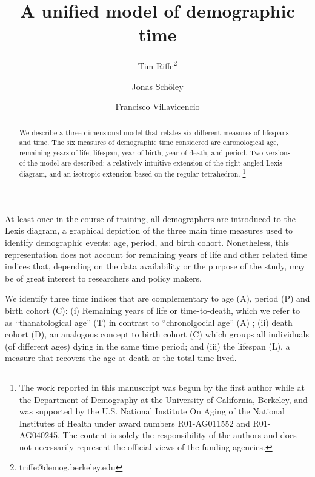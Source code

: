\documentclass[11pt,oneside,a4paper]{article} %
\newcommand\ackn[1]{%
  \begingroup
  \renewcommand\thefootnote{}\footnote{#1}%
  \addtocounter{footnote}{-1}%
  \endgroup
}
\begin{document}
\title{A unified model of demographic time}

\author[1]{Tim Riffe\thanks{triffe@demog.berkeley.edu}}
\author[2,3]{Jonas Sch{\"o}ley}
\author[2,3]{Francisco Villavicencio}


\maketitle

\begin{abstract}
We describe a three-dimensional model that relates six different measures of
lifespans and time. The six measures of demographic time considered are
chronological age, remaining years of life, lifespan, year of birth, year of
death, and period. Two versions of the model are described: a relatively intuitive
extension of the right-angled Lexis diagram, and an isotropic extension based on
the regular tetrahedron. \ackn{The work reported in this manuscript was begun by
the first author while at the Department of Demography at the University of
California, Berkeley, and was supported by the U.S.
National Institute On Aging of the National Institutes of Health under award
numbers R01-AG011552 and R01-AG040245. The content is solely the responsibility of the authors and does not necessarily represent the official views of the funding agencies.}
\end{abstract}
At least once in the course of training, all demographers are introduced
to the Lexis diagram, a graphical depiction of the three main time measures used to identify demographic events: age, period, and birth cohort. Nonetheless, this representation does not account for remaining years of life and other related time indices that, depending on the data availability or the purpose of the study, may be of great interest to researchers and policy makers.

We identify three time indices that are complementary to age (A), period (P) and
birth cohort (C):
(i) Remaining years of life or time-to-death, which we refer to as
``thanatological age'' (T) in contrast to ``chronolgocial age'' (A)
\citep{riffe2015force}; (ii) death cohort (D), an analogous concept to birth
cohort (C) which groups all individuals (of different ages) dying in the same time period; and (iii) the lifespan (L), a measure that recovers the age at death or the total time lived.
\end{document}
